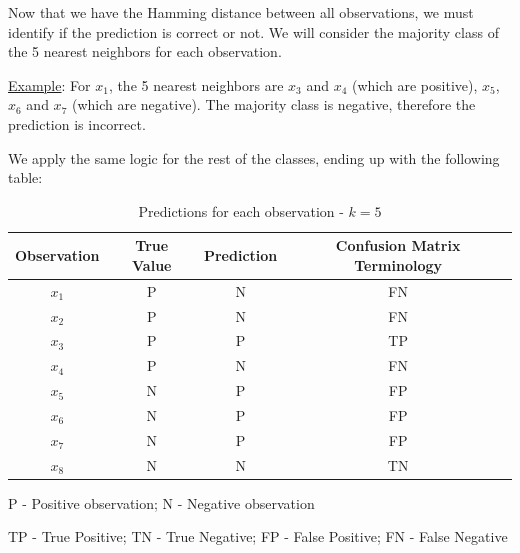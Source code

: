 \documentclass[12pt]{article}
\begin{document}
\begin{enumerate}[leftmargin=\labelsep]
    Now that we have the Hamming distance between all observations, we must identify if the prediction is correct or not. We will consider the majority class of the 5 nearest neighbors for each observation.
    
    \vspace{10pt}
    \underline{Example}: For $x_1$, the 5 nearest neighbors are $x_3$ and $x_4$ (which are positive), $x_5$, $x_6$ and $x_7$ (which are negative). The majority class is negative, therefore the prediction is incorrect.
    
    \newpage
    We apply the same logic for the rest of the classes, ending up with the following table:

    \begin{table}[H]
        \begin{center}
            \begin{threeparttable}
            \begin{tabular}{c|c|c|c}
                Observation & True Value & Prediction & Confusion Matrix Terminology\\
                \hline
                $x_1$ & P & N & FN\\
                $x_2$ & P & N & FN\\
                $x_3$ & P & P & TP\\
                $x_4$ & P & N & FN\\
                $x_5$ & N & P & FP\\
                $x_6$ & N & P & FP\\
                $x_7$ & N & P & FP\\
                $x_8$ & N & N & TN\\
            \end{tabular}
            \begin{tablenotes}
                \small
                \item[]
                \item[P - Positive observation; N - Negative observation]  
                \item[TP - True Positive; TN - True Negative; FP - False Positive; FN - False Negative] 
                \item[] 
            \end{tablenotes}
        \end{threeparttable}
            \caption{Predictions for each observation - $k=5$}
        \end{center}
    \end{table}


\end{enumerate}
\end{document}
